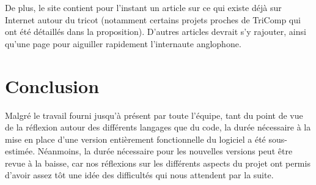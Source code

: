 \documentclass{article}
\begin{document}
De plus, le site contient pour l'instant un article sur ce qui existe déjà sur Internet autour du tricot (notamment certains projets
proches de TriComp qui ont été détaillés dans la proposition). D'autres articles devrait s'y rajouter, ainsi qu'une page pour aiguiller
rapidement l'internaute anglophone.

\section{Conclusion}

Malgré le travail fourni jusqu'à présent par toute l'équipe, tant du point de vue de la réflexion autour des différents langages que du code, la durée nécessaire à la mise en place d'une version entièrement fonctionnelle du logiciel a été sous-estimée. Néanmoins, la durée nécessaire pour les nouvelles versions peut être revue à la baisse, car nos réflexions sur les différents aspects du projet ont permis d'avoir assez tôt une idée des difficultés qui nous attendent par la suite.
\end{document}
